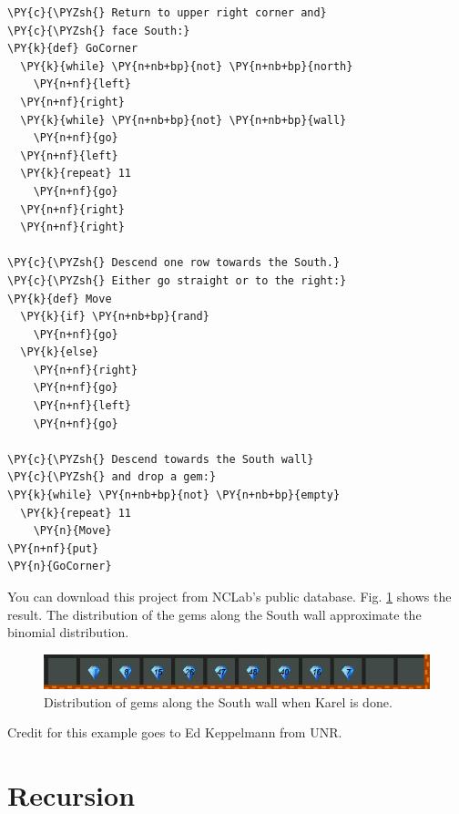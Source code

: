 \begin{bbox}
\begin{Verbatim}[commandchars=\\\{\}]
\PY{c}{\PYZsh{} Return to upper right corner and}
\PY{c}{\PYZsh{} face South:}
\PY{k}{def} GoCorner
  \PY{k}{while} \PY{n+nb+bp}{not} \PY{n+nb+bp}{north}
    \PY{n+nf}{left}
  \PY{n+nf}{right}
  \PY{k}{while} \PY{n+nb+bp}{not} \PY{n+nb+bp}{wall}
    \PY{n+nf}{go}
  \PY{n+nf}{left}
  \PY{k}{repeat} 11
    \PY{n+nf}{go}
  \PY{n+nf}{right}
  \PY{n+nf}{right}

\PY{c}{\PYZsh{} Descend one row towards the South.}
\PY{c}{\PYZsh{} Either go straight or to the right:}
\PY{k}{def} Move
  \PY{k}{if} \PY{n+nb+bp}{rand}
    \PY{n+nf}{go}
  \PY{k}{else}
    \PY{n+nf}{right}
    \PY{n+nf}{go}
    \PY{n+nf}{left}
    \PY{n+nf}{go}

\PY{c}{\PYZsh{} Descend towards the South wall}
\PY{c}{\PYZsh{} and drop a gem:}
\PY{k}{while} \PY{n+nb+bp}{not} \PY{n+nb+bp}{empty}
  \PY{k}{repeat} 11
    \PY{n}{Move}
\PY{n+nf}{put}
\PY{n}{GoCorner}

\end{Verbatim}
\end{bbox}
\vspace{6mm}
\hfill

\newpage
\noindent
You can download this project from NCLab's public database.
Fig. \ref{fig:binomial2} shows the result. The distribution of the 
gems along the South wall approximate the binomial distribution. 

\begin{figure}[!ht]
\begin{center}
\includegraphics[width=14cm]{img/binomial2.png}
\vspace{-0mm}
\caption{Distribution of gems along the South wall when Karel is done.}
\label{fig:binomial2}
\end{center}
\end{figure}

\noindent
Credit for this example goes to Ed Keppelmann from UNR. 


\section{Recursion} \label{sec:recursion}

